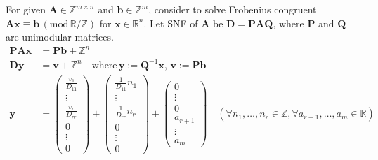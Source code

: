 For given $\bm{A} \in \mathbb{Z}^{m \times n}$ and $\bm{b} \in \mathbb{Z}^{m}$, consider to solve Frobenius congruent $\bm{Ax} \equiv \bm{b} \, (\mathrm{mod}\, \mathbb{R}/\mathbb{Z})$ for $\bm{x} \in \mathbb{R}^{n}$.
Let SNF of $\bm{A}$ be $\bm{D} = \bm{PAQ}$, where $\bm{P}$ and $\bm{Q}$ are unimodular matrices.
\begin{align}
  \bm{PAx} &= \bm{Pb} + \mathbb{Z}^{n} \\
  \bm{Dy}  &= \bm{v} + \mathbb{Z}^{n} \quad \mbox{where}\, \bm{y}:= \bm{Q}^{-1} \bm{x},\, \bm{v}:= \bm{Pb} \\
  \bm{y}
    &= \begin{pmatrix} \frac{v_{1}}{D_{11}} \\ \vdots \\ \frac{v_{r}}{D_{rr}} \\ 0 \\ \vdots \\ 0 \end{pmatrix}
        + \begin{pmatrix} \frac{1}{D_{11}} n_{1} \\ \vdots \\ \frac{1}{D_{rr}} n_{r} \\ 0 \\ \vdots \\ 0 \end{pmatrix}
        + \begin{pmatrix} 0 \\ \vdots \\ 0 \\ a_{r+1} \\ \vdots \\ a_{m} \end{pmatrix}
        \quad (\forall n_{1}, \dots, n_{r} \in \mathbb{Z}, \forall a_{r+1}, \dots, a_{m} \in \mathbb{R})
\end{align}
